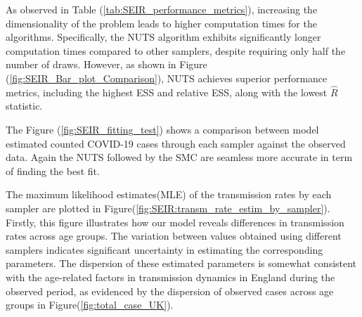 \documentclass[nonatbib,preprint,12pt,authoryear]{elsarticle}
\begin{document}
As observed in Table (\ref{tab:SEIR_performance_metrics}), increasing the dimensionality of the problem leads to higher computation times for the algorithms. Specifically, the NUTS algorithm exhibits significantly longer computation times compared to other samplers, despite requiring only half the number of draws. However, as shown in Figure (\ref{fig:SEIR_Bar_plot_Comparison}), NUTS achieves superior performance metrics, including the highest ESS and relative ESS, along with the lowest $\hat{R}$ statistic.  

The Figure (\ref{fig:SEIR_fitting_test}) shows a comparison between model estimated counted COVID-19 cases  through each sampler against the observed data. Again the NUTS followed by the SMC are seamless more accurate in term of finding the best fit.

The maximum likelihood estimates(MLE) of the transmission rates by each sampler are plotted in Figure(\ref{fig:SEIR:transm_rate_estim_by_sampler}). Firstly, this figure illustrates how our model reveals differences in transmission rates across age groups. The variation between values obtained using different samplers indicates significant uncertainty in estimating the corresponding parameters. The dispersion of these estimated parameters is somewhat consistent with the age-related factors in transmission dynamics in England during the observed period, as evidenced by the dispersion of observed cases across age groups in Figure(\ref{fig:total_case_UK}).  
\begin{table}[H]
    \centering
    \caption{Summary of sampler performance metrics}
    \label{tab:SEIR_performance_metrics}
\end{table}
\end{document}
